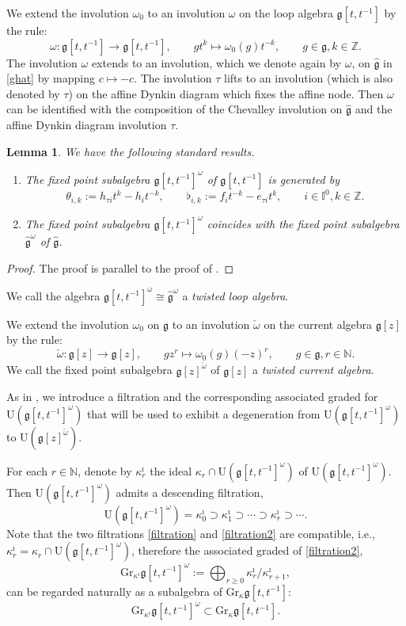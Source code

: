 \documentclass[11pt,reqno]{amsart}
\numberwithin{equation}{section}
\newtheorem{lem}[thm]{Lemma}
\theoremstyle{definition}
\theoremstyle{remark}
\newcommand{\beq}{\begin{equation}}
\newcommand{\eeq}{\end{equation}}
\newcommand{\bN}{\mathbb{N}}
\newcommand{\g}{\mathfrak{g}}
\newcommand{\gge}{\geqslant}
\newcommand{\wt}{\widehat}
\newcommand{\ka}{\kappa}
\newcommand{\rU}{{\mathrm{U}}}
\def \Gr{\mathrm{Gr}}
\def \I{\mathbb{I}}
\def \Z{\mathbb{Z}}
\def \hg{\mathfrak{g}[t,t^{-1}]}
\begin{document}
We extend the involution $\omega_0$ to an involution $\omega$ on the loop algebra $\hg$ by the rule:
\beq
\label{def:thetahat}
\omega:\hg\to \hg,\qquad gt^k\mapsto \omega_0(g)t^{-k},\qquad g\in \g,k\in\Z.
\eeq
The involution $\omega$ extends to an involution, which we denote again by $\omega$, on $\wt{\g}$ in \eqref{ghat} by mapping $c\mapsto -c$. The involution $\tau$ lifts to an involution (which is also denoted by $\tau$) on the affine Dynkin diagram which fixes the affine node. Then $\omega$ can be identified with the composition of the Chevalley involution on $\wt{\g}$ and the affine Dynkin diagram involution $\tau$.

\begin{lem}
We have the following standard results.
\begin{enumerate}
    \item The fixed point subalgebra $\hg^\omega$ of $\hg$ is generated by
    \beq\label{hggen}
    \theta_{i,k}:=h_{\tau i}t^k-h_it^{-k},\qquad \flat_{i,k}:=f_it^{-k}-e_{\tau i}t^k,\qquad i\in \I^0,k\in\Z.
    \eeq
    \item The fixed point subalgebra $\hg^\omega$ coincides with the fixed point subalgebra $\wt{\g}^\omega$ of $\wt{\g}$.
\end{enumerate}
\end{lem}
\begin{proof}
The proof is parallel to the proof of \cite[Lem. 2.2]{KLWZ23b}.
\end{proof}

We call the algebra $\hg^\omega\cong \wt{\g}^\omega$ a \emph{twisted loop algebra}.

We extend the involution $\omega_0$ on $\g$ to an involution $\check{\omega}$ on the current algebra $\g[z]$ by the rule:
\beq\label{omeche}
\check\omega:\g[z]\to \g[z],\qquad g z^r\mapsto \omega_0(g)(-z)^r,\qquad g\in\g, r\in\bN.
\eeq
We call the fixed point subalgebra $\g[z]^{\check\omega}$ of $\g[z]$ a \emph{twisted current algebra}.

As in \cite[\S2]{KLWZ23b}, we introduce a filtration and the corresponding associated graded for $\rU(\hg^\omega)$ that will be used to exhibit a degeneration from $\rU(\hg^\omega)$ to $\rU(\g[z]^{\check\omega})$.

For each $r\in\bN$, denote by $\ka^\imath_r$ the ideal $\ka_r \cap \rU(\hg^\omega)$ of $\rU(\hg^\omega)$. Then $\rU(\hg^\omega)$ admits a descending filtration,
\beq  \label{filtration2}
\rU(\g[t,t^{-1}]^\omega) =\kappa_0^\imath \supset \kappa_1^\imath \supset \cdots \supset \kappa_r^\imath \supset \cdots. 
\eeq
Note that the two filtrations \eqref{filtration} and \eqref{filtration2} are compatible, i.e., $\ka^\imath_r=\ka_r \cap \rU(\hg^\omega)$, therefore the associated graded of \eqref{filtration2}, 
$$
\Gr_{\ka^\imath}\hg^\omega:=\bigoplus_{r\gge 0} \ka_r^\imath / \ka_{r+1}^\imath,
$$ 
can be regarded naturally as a subalgebra of $\Gr_{\ka}\hg$:
\beq  \label{GrGr}
\Gr_{\ka^\imath}\hg^\omega  \subset \Gr_{\ka}\hg.
\eeq
\end{document}
